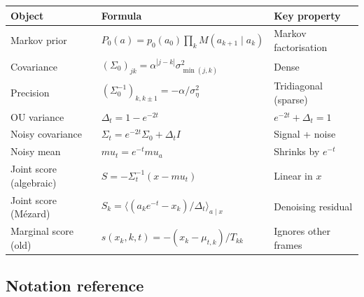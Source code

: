 \documentclass[12pt, a4paper]{article}
\def\ba{a}%
\def\bx{x}%
\def\bmu{mu}%
\def\bm#1{#1}%
\theoremstyle{definition}
\newcommand{\ba}{\bm{a}}
\newcommand{\bx}{\bm{x}}
\newcommand{\bmu}{\bm{\mu}}
\newcommand{\dt}{\Delta_t}
\begin{document}
\begin{center}
\renewcommand{\arraystretch}{1.6}
\begin{tabular}{lll}
\toprule
\textbf{Object} & \textbf{Formula} & \textbf{Key property} \\
\midrule
Markov prior & $P_0(\ba) = p_0(a_0)\prod_k M(a_{k+1}\mid a_k)$ &
  Markov factorisation \\
Covariance & $(\Sigma_0)_{jk} = \alpha^{|j-k|}\sigma_{\min(j,k)}^2$ &
  Dense \\
Precision & $(\Sigma_0^{-1})_{k,k\pm1} = -\alpha/\sigma_\eta^2$ &
  Tridiagonal (sparse) \\
OU variance & $\dt = 1 - e^{-2t}$ & $e^{-2t}+\dt=1$ \\
Noisy covariance & $\Sigma_t = e^{-2t}\Sigma_0 + \dt I$ &
  Signal + noise \\
Noisy mean & $\bmu_t = e^{-t}\bmu_a$ & Shrinks by $e^{-t}$ \\
Joint score (algebraic) & $\bm{S} = -\Sigma_t^{-1}(\bx-\bmu_t)$ &
  Linear in $\bx$ \\
Joint score (M\'ezard) & $S_k = \langle(a_k e^{-t}-x_k)/\dt\rangle_{\ba\mid\bx}$ &
  Denoising residual \\
Marginal score (old) & $s(x_k,k,t) = -(x_k-\mu_{t,k})/T_{kk}$ &
  Ignores other frames \\
\bottomrule
\end{tabular}
\end{center}

\subsection{Notation reference}
\end{document}
